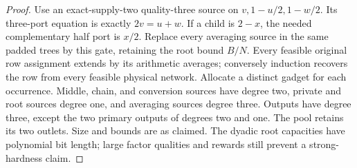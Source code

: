 \begin{proof}
Use an exact-supply-two quality-three source on
$v,1-u/2,1-w/2$. Its three-port equation is exactly $2v=u+w$.
If a child is $2-x$, the needed complementary half port is $x/2$.
Replace every averaging source in the same padded trees by this gate,
retaining the root bound $B/N$. Every feasible original row assignment
extends by its arithmetic averages; conversely induction recovers the
row from every feasible physical network. Allocate a distinct gadget
for each occurrence. Middle, chain, and conversion sources have degree
two, private and root sources degree one, and averaging sources degree
three. Outputs have degree three, except the two primary outputs of
degrees two and one. The pool retains its two outlets. Size and bounds
are as claimed. The dyadic root capacities have polynomial bit length;
large factor qualities and rewards still prevent a strong-hardness claim.
\end{proof}

